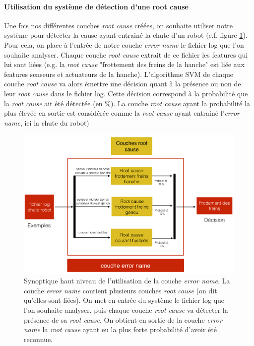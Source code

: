 \paragraph{Utilisation du système de détection d'une root cause}
Une fois nos différentes couches \emph{root cause} créées, on souhaite utiliser notre système pour détecter la cause ayant entrainé la chute d'un robot (c.f. figure \ref{fig:utilisation de la couche error name}). Pour cela, on place à l'entrée de notre couche \emph{error name} le fichier log que l'on souhaite analyser. Chaque couche \emph{root cause} extrait de ce fichier les features qui lui sont liées (e.g. la \emph{root cause} "frottement des freins de la hanche" est liée aux features senseurs et actuateurs de la hanche). L'algorithme SVM de chaque couche \emph{root cause} va alors émettre une décision quant à la présence ou non de leur \emph{root cause} dans le fichier log. Cette décision correspond à la probabilité que la \emph{ root cause} ait été détectée (en \%). La couche \emph{root cause} ayant la probabilité la plus élevée en sortie est considérée comme la \emph{root cause} ayant entrainé l'\emph{error name},  ici la chute du robot) 

\begin{figure}[h]
	\centering\includegraphics[width=15cm]{images/synoptique_error.png}
	\caption[Utilisation de la couche error name]{Synoptique haut niveau de l'utilisation de la couche \emph{error name}. La couche \emph{error name} contient plusieurs couches \emph{root cause} (on dit qu'elles sont liées). On met en entrée du système le fichier log que l'on souhaite analyser, puis chaque couche \emph{root cause} va détecter la présence de sa \emph{root cause}. On obtient en sortie de la couche \emph{error name} la \emph{root cause}  ayant eu la plus forte probabilité d'avoir été reconnue.}
	\label{fig:utilisation de la couche error name}
\end{figure}

